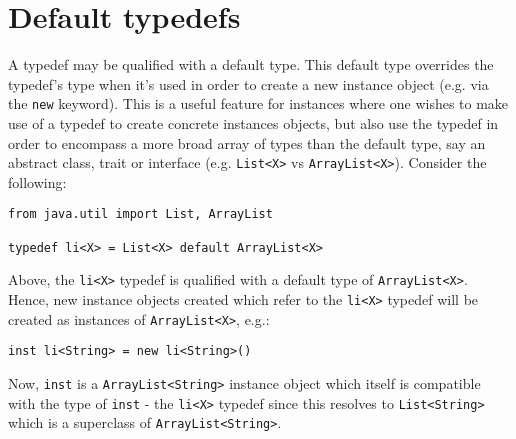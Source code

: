\documentclass[conc-doc]{subfiles}
\begin{document}
\section{Default typedefs}
A typedef may be qualified with a default type. This default type overrides the typedef's type when it's used in order to create a new instance object (e.g. via the \lstinline{new} keyword). This is a useful feature for instances where one wishes to make use of a typedef to create concrete instances objects, but also use the typedef in order to encompass a more broad array of types than the default type, say an abstract class, trait or interface (e.g. \lstinline{List<X>} vs \lstinline{ArrayList<X>}). Consider the following:
\begin{lstlisting}
from java.util import List, ArrayList

typedef li<X> = List<X> default ArrayList<X>
\end{lstlisting}

Above, the \lstinline{li<X>} typedef is qualified with a default type of \lstinline{ArrayList<X>}. Hence, new instance objects created which refer to the \lstinline{li<X>} typedef will be created as instances of \lstinline{ArrayList<X>}, e.g.:
\begin{lstlisting}
inst li<String> = new li<String>()
\end{lstlisting}

Now, \lstinline{inst} is a \lstinline{ArrayList<String>} instance object which itself is compatible with the type of \lstinline{inst} - the \lstinline{li<X>} typedef since this resolves to \lstinline{List<String>} which is a superclass of \lstinline{ArrayList<String>}.
\end{document}
